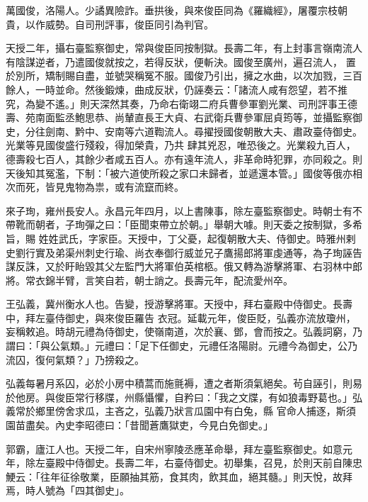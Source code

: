 \begin{pinyinscope}
 萬國俊，洛陽人。少譎異險詐。垂拱後，與來俊臣同為《羅織經》，屠覆宗枝朝貴，以作威勢。自司刑評事，俊臣同引為判官。



 天授二年，攝右臺監察御史，常與俊臣同按制獄。長壽二年，有上封事言嶺南流人有陰謀逆者，乃遣國俊就按之，若得反狀，便斬決。國俊至廣州，遍召流人，
 置於別所，矯制賜自盡，並號哭稱冤不服。國俊乃引出，擁之水曲，以次加戮，三百餘人，一時並命。然後鍛煉，曲成反狀，仍誣奏云：「諸流人咸有怨望，若不推究，為變不遙。」則天深然其奏，乃命右衛翊二府兵曹參軍劉光業、司刑評事王德壽、苑南面監丞鮑思恭、尚輦直長王大貞、右武衛兵曹參軍屈貞筠等，並攝監察御史，分往劍南、黔中、安南等六道鞫流人。尋擢授國俊朝散大夫、肅政臺侍御史。光業等見國俊盛行殘殺，得加榮貴，乃共
 肆其兇忍，唯恐後之。光業殺九百人，德壽殺七百人，其餘少者咸五百人。亦有遠年流人，非革命時犯罪，亦同殺之。則天後知其冤濫，下制：「被六道使所殺之家口未歸者，並遞還本管。」國俊等俄亦相次而死，皆見鬼物為祟，或有流竄而終。



 來子珣，雍州長安人。永昌元年四月，以上書陳事，除左臺監察御史。時朝士有不帶靴而朝者，子珣彈之曰：「臣聞束帶立於朝。」舉朝大噱。則天委之按制獄，多希旨，賜
 姓姓武氏，字家臣。天授中，丁父憂，起復朝散大夫、侍御史。時雅州剌史劉行實及弟渠州刺史行瑜、尚衣奉御行威並兄子鷹揚郎將軍虔通等，為子珣誣告謀反誅，又於盱眙毀其父左監門大將軍伯英棺柩。俄又轉為游擊將軍、右羽林中郎將。常衣錦半臂，言笑自若，朝士誚之。長壽元年，配流愛州卒。



 王弘義，冀州衡水人也。告變，授游擊將軍。天授中，拜右臺殿中侍御史。長壽中，拜左臺侍御史，與來俊臣羅告
 衣冠。延載元年，俊臣貶，弘義亦流放瓊州，妄稱敕追。時胡元禮為侍御史，使嶺南道，次於襄、鄧，會而按之。弘義詞窮，乃謂曰：「與公氣類。」元禮曰：「足下任御史，元禮任洛陽尉。元禮今為御史，公乃流囚，復何氣類？」乃搒殺之。



 弘義每暑月系囚，必於小房中積蒿而施氈褥，遭之者斯須氣絕矣。茍自誣引，則易於他房。與俊臣常行移牒，州縣懾懼，自矜曰：「我之文牒，有如狼毒野葛也。」弘義常於鄉里傍舍求瓜，主吝之，弘義乃狀言瓜園中有白兔，縣
 官命人捕逐，斯須園苗盡矣。內史李昭德曰：「昔聞蒼鷹獄吏，今見白免御史。」



 郭霸，廬江人也。天授二年，自宋州寧陵丞應革命舉，拜左臺監察御史。如意元年，除左臺殿中侍御史。長壽二年，右臺侍御史。初舉集，召見，於則天前自陳忠鯁云：「往年征徐敬業，臣願抽其筋，食其肉，飲其血，絕其髓。」則天悅，故拜焉，時人號為「四其御史」。




\end{pinyinscope}
